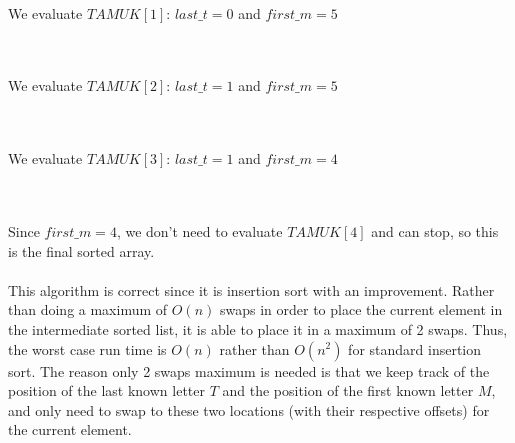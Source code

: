 \documentclass[12pt]{report}
\begin{document}
\\We evaluate $TAMUK[1]$: $last\_t=0$ and $first\_m=5$\\\\
\\We evaluate $TAMUK[2]$: $last\_t=1$ and $first\_m=5$\\\\
\\We evaluate $TAMUK[3]$: $last\_t=1$ and $first\_m=4$\\\\
\\Since $first\_m=4$, we don't need to evaluate $TAMUK[4]$ and can stop, so this is the final sorted array.\\\\
This algorithm is correct since it is insertion sort with an improvement. 
Rather than doing a maximum of $O(n)$ swaps in order to place the current element in the intermediate sorted list, 
it is able to place it in a maximum of 2 swaps. Thus, the worst case run time is $O(n)$ rather than $O(n^2)$ for standard insertion sort.
The reason only 2 swaps maximum is needed is that we keep track of the position of the last known letter $T$ and the position of the first known letter $M$, 
and only need to swap to these two locations (with their respective offsets) for the current element.
\end{document}
